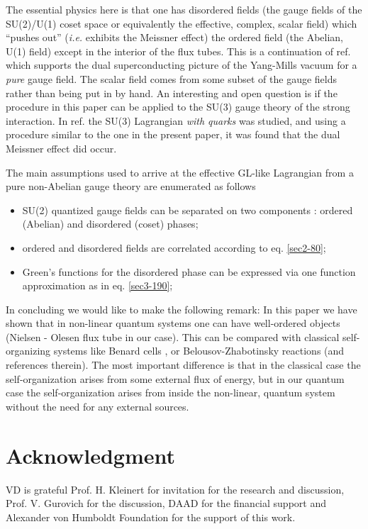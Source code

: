\documentclass[a4paper,aps,showpacs]{revtex4}
\begin{document}
The essential physics here is that one has disordered fields (the gauge fields
of the SU(2)/U(1) coset space or equivalently the effective, complex, scalar field)
which ``pushes out'' ({\it i.e.} exhibits the Meissner effect)
the ordered field (the Abelian, U(1) field) except in the interior of the flux tubes.
This is a continuation of ref. \cite{dzhsin02a} which supports the dual superconducting
picture of the Yang-Mills vacuum for a {\it pure} gauge field. The scalar field
comes from some subset of the gauge fields rather than being put in by
hand. An interesting and open question is
if the procedure in this paper can be applied to the SU(3) gauge theory of the
strong interaction. In ref. \cite{par} the SU(3) Lagrangian {\it with quarks} was
studied, and using a procedure similar to the one in the  present paper, it was found that
the dual Meissner effect did occur.
\par 
The main assumptions used to arrive at the effective GL-like
Lagrangian from a pure non-Abelian gauge theory are enumerated as follows
\begin{itemize}
    \item 
    SU(2) quantized gauge fields can be separated on two components : 
    ordered (Abelian) and disordered (coset) phases; 
    \item 
    ordered and disordered fields are correlated according to eq. \eqref{sec2-80}; 
    \item 
    Green's functions for the disordered phase can be expressed via 
    one function approximation as in eq. \eqref{sec3-190}; 
      \end{itemize}    
In concluding we would like to make the following remark: In this paper 
we have shown that in non-linear quantum systems one can have  
well-ordered objects (Nielsen - Olesen flux tube in our case). This can be 
compared with classical self-organizing systems like Benard cells \cite{ben}, or
Belousov-Zhabotinsky \cite{jab} reactions (and references therein). 
The most important difference is that in 
the classical case the self-organization arises from some external flux 
of energy, but in our quantum case the self-organization arises from inside the 
non-linear, quantum system without the need for any external sources.

\section{Acknowledgment}

VD is grateful Prof. H. Kleinert for invitation for the research 
and discussion, Prof. V. Gurovich for the discussion, 
DAAD for the financial support and Alexander von Humboldt Foundation 
for the support of this work. 
\end{document}
